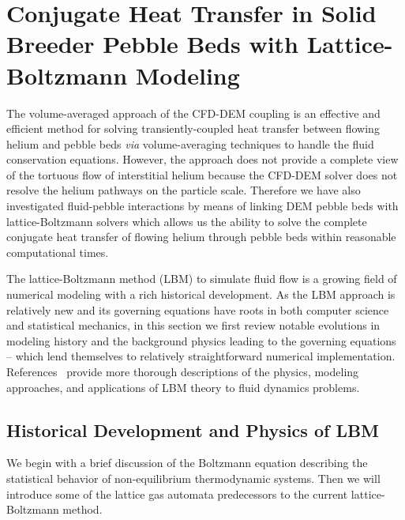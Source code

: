 
%
%
\chapter{Conjugate Heat Transfer in Solid Breeder Pebble Beds with Lattice-Boltzmann Modeling}\label{sec:modeling-lbm}
The volume-averaged approach of the CFD-DEM coupling is an effective and efficient method for solving transiently-coupled heat transfer between flowing helium and pebble beds \textit{via} volume-averaging techniques to handle the fluid conservation equations. However, the approach does not provide a complete view of the tortuous flow of interstitial helium because the CFD-DEM solver does not resolve the helium pathways on the particle scale. Therefore we have also investigated fluid-pebble interactions by means of linking DEM pebble beds with lattice-Boltzmann solvers which allows us the ability to solve the complete conjugate heat transfer of flowing helium through pebble beds within reasonable computational times.

The lattice-Boltzmann method (LBM) to simulate fluid flow is a growing field of numerical modeling with a rich historical development. As the LBM approach is relatively new and its governing equations have roots in both computer science and statistical mechanics, in this section we first review notable evolutions in modeling history and the background physics leading to the governing equations -- which lend themselves to relatively straightforward numerical implementation. References~\cite{Chen1998a,Viggen2009,Sukop2007,Chopard2002,succi2001lattice} provide more thorough descriptions of the physics, modeling approaches, and applications of LBM theory to fluid dynamics problems.

\section{Historical Development and Physics of LBM}
We begin with a brief discussion of the Boltzmann equation describing the statistical behavior of non-equilibrium thermodynamic systems. Then we will introduce some of the lattice gas automata predecessors to the current lattice-Boltzmann method.


